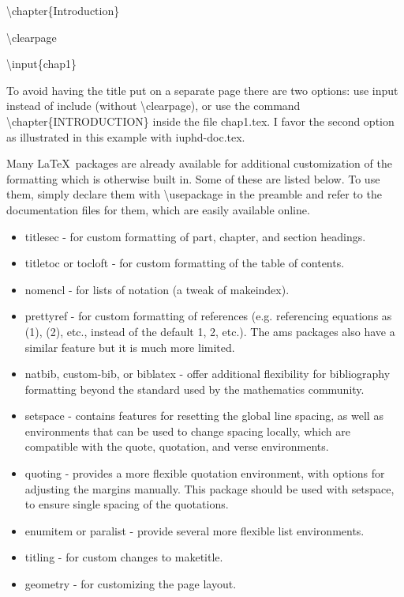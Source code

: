 \textbackslash chapter\{Introduction\}

\textbackslash clearpage

\textbackslash input\{chap1\}
\medskip

\noindent To avoid having the title put on a separate page there are two options: use input instead of include
(without \textbackslash clearpage), or use the command \textbackslash chapter\{INTRODUCTION\} inside the file chap1.tex.
I favor the second option as illustrated in this example with iuphd-doc.tex.

Many \LaTeX \ packages are already available for additional customization of the formatting which is otherwise built in.
Some of these are listed below.  To use them, simply declare them with \textbackslash usepackage in the preamble
and refer to the documentation files for them, which are easily available online.

\begin{itemize}
 \item titlesec - for custom formatting of part, chapter, and section headings.
 \item titletoc or tocloft - for custom formatting of the table of contents.
 \item nomencl - for lists of notation (a tweak of makeindex).
 \item prettyref - for custom formatting of references (e.g. referencing equations as (1), (2), etc., instead of the default
       1, 2, etc.).  The ams packages also have a similar feature but it is much more limited.
 \item natbib, custom-bib, or biblatex - offer additional flexibility for bibliography formatting beyond the standard used by
       the mathematics community.
 \item setspace - contains features for resetting the global line spacing, as well as environments that can be used to change
       spacing locally, which are compatible with the quote, quotation, and verse environments.
 \item quoting - provides a more flexible quotation environment, with options for adjusting the margins manually.  This package
     should be used with setspace, to ensure single spacing of the quotations.
 \item enumitem or paralist - provide several more flexible list environments.
 \item titling - for custom changes to maketitle.
 \item geometry - for customizing the page layout.
\end{itemize}

